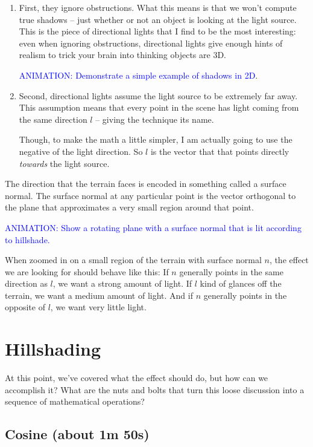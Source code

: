 \documentclass{article}
\newcommand\animation[1]{\textcolor{blue}{ANIMATION: #1}}
\begin{document}
\begin{enumerate}
	
\item First, they ignore obstructions.
What this means is that we won't compute true shadows -- just whether or not an object is looking at the light source.
This is the piece of directional lights that I find to be the most interesting: even when ignoring obstructions, directional lights give enough hints of realism to trick your brain into thinking objects are 3D.

\animation{Demonstrate a simple example of shadows in 2D}.
	
\item Second, directional lights assume the light source to be extremely far away.
This assumption means that every point in the scene has light coming from the same direction $l$ -- giving the technique its name.

Though, to make the math a little simpler, I am actually going to use the negative of the light direction.
So $l$ is the vector that that points directly \textit{towards} the light source.

\end{enumerate}

The direction that the terrain faces is encoded in something called a surface normal.
The surface normal at any particular point is the vector orthogonal to the plane that approximates a very small region around that point.

\animation{Show a rotating plane with a surface normal that is lit according to hillshade.}

When zoomed in on a small region of the terrain with surface normal $n$, the effect we are looking for should behave like this:
If $n$ generally points in the same direction as $l$, we want a strong amount of light.
If $l$ kind of glances off the terrain, we want a medium amount of light.
And if $n$ generally points in the opposite of $l$, we want very little light.

\section{Hillshading}

At this point, we've covered what the effect should do, but how can we accomplish it?
What are the nuts and bolts that turn this loose discussion into a sequence of mathematical operations?

\subsection{Cosine (about 1m 50s)}
\end{document}
